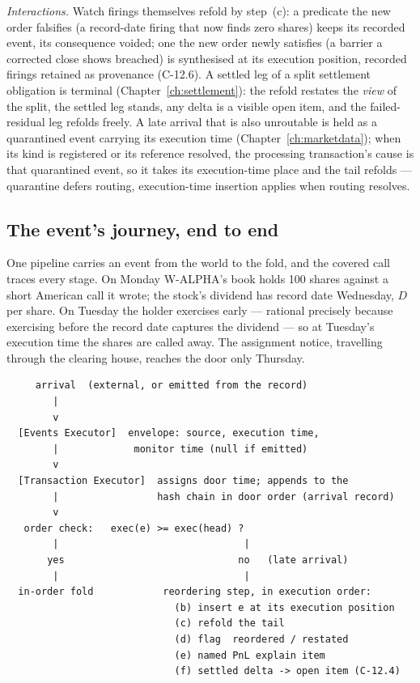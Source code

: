 \documentclass[11pt,a4paper]{article}
\begin{document}
\emph{Interactions.} Watch firings themselves refold by step~(c): a predicate the new order
falsifies (a record-date firing that now finds zero shares) keeps its recorded event, its
consequence voided; one the new order newly satisfies (a barrier a corrected close shows
breached) is synthesised at its execution position, recorded firings retained as provenance
(C-12.6). A settled leg of a split
settlement obligation is terminal
(Chapter~\ref{ch:settlement}): the refold restates the \emph{view} of the split, the settled
leg stands, any delta is a visible open item, and the failed-residual leg refolds freely. A late
arrival that is also unroutable is held as a quarantined event carrying its execution time
(Chapter~\ref{ch:marketdata}); when its kind is registered or its reference resolved, the
processing transaction's cause is that quarantined event, so it takes its execution-time place
and the tail refolds --- quarantine defers routing, execution-time insertion applies when
routing resolves.

\subsection{The event's journey, end to end}\label{sec:workflow}

One pipeline carries an event from the world to the fold, and the covered call traces every
stage. On Monday W-ALPHA's book holds 100 shares against a short American call it wrote; the
stock's dividend has record date Wednesday, $D$ per share. On Tuesday the holder exercises
early --- rational precisely because exercising before the record date captures the dividend
--- so at Tuesday's execution time the shares are called away. The assignment notice,
travelling through the clearing house, reaches the door only Thursday.

{\small
\begin{verbatim}
     arrival  (external, or emitted from the record)
        |
        v
  [Events Executor]  envelope: source, execution time,
        |             monitor time (null if emitted)
        v
  [Transaction Executor]  assigns door time; appends to the
        |                 hash chain in door order (arrival record)
        v
   order check:   exec(e) >= exec(head) ?
        |                                |
       yes                              no   (late arrival)
        |                                |
  in-order fold            reordering step, in execution order:
                             (b) insert e at its execution position
                             (c) refold the tail
                             (d) flag  reordered / restated
                             (e) named PnL explain item
                             (f) settled delta -> open item (C-12.4)
\end{verbatim}
}
\end{document}
